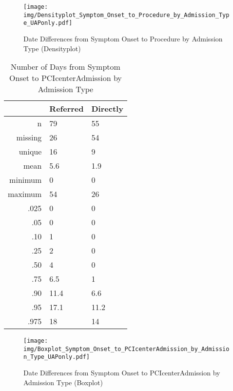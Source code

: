 \documentclass[presentation,xcolor=pdftex,dvipsnames,table,11pt]{beamer}
\begin{document}
\begin{tiny}
\begin{frame}
\begin{figure}
  \centering
  \caption{Date Differences from Symptom Onset to Procedure by Admission Type (Densityplot)}
  \label{Density: Date Differences from Symptom Onset to Procedure by Admission Type}
\texttt{[image: img/Densityplot\_Symptom\_Onset\_to\_Procedure\_by\_Admission\_Type\_UAPonly.pdf]}\end{figure}
\end{frame}




\begin{table}[ht]
\centering
\begin{tabular}{rll}
  \toprule
 & Referred & Directly \\ 
  \midrule
n & 79 & 55 \\ 
  missing & 26 & 54 \\ 
  unique & 16 & 9 \\ 
  mean & 5.6 & 1.9 \\ 
  minimum & 0 & 0 \\ 
  maximum & 54 & 26 \\ 
  .025 & 0 & 0 \\ 
  .05 & 0 & 0 \\ 
  .10 & 1 & 0 \\ 
  .25 & 2 & 0 \\ 
  .50 & 4 & 0 \\ 
  .75 & 6.5 & 1 \\ 
  .90 & 11.4 & 6.6 \\ 
  .95 & 17.1 & 11.2 \\ 
  .975 & 18 & 14 \\ 
   \bottomrule
\end{tabular}
\caption{Number of Days from Symptom Onset to PCIcenterAdmission by Admission Type} 
\end{table}
\begin{frame}
\begin{figure}
  \centering
  \caption{Date Differences from Symptom Onset to PCIcenterAdmission by Admission Type (Boxplot)}
  \label{Boxplot: Date Differences from Symptom Onset to PCIcenterAdmission by Admission Type}
\texttt{[image: img/Boxplot\_Symptom\_Onset\_to\_PCIcenterAdmission\_by\_Admission\_Type\_UAPonly.pdf]}\end{figure}
\end{frame}



\end{tiny}
\end{document}
